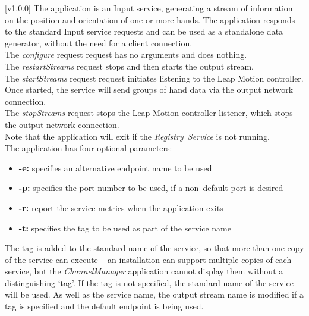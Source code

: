 [v1.0.0]
The  application is an Input service,
generating a stream of information on the position and orientation of one or more hands.
The application responds to the standard Input service requests and can be used as a
standalone data generator, without the need for a client connection.\\

The \emph{configure} request request has no arguments and does nothing.\\

The \emph{restartStreams} request stops and then starts the output stream.\\

The \emph{startStreams} request request initiates listening to the Leap Motion controller.
Once started, the service will send groups of hand data via the output \yarp{} network
connection.\\

The \emph{stopStreams} request stops the Leap Motion controller listener, which stops the
output \yarp{} network connection.\\ 

Note that the application will exit if the \emph{Registry~Service} is not running.\\

The application has four optional parameters:
\begin{itemize}
\item \textbf{-e:} specifies an alternative endpoint name to be used
\item \textbf{-p:} specifies the port number to be used, if a non--default port is desired
\item \textbf{-r:} report the service metrics when the application exits
\item \textbf{-t:} specifies the tag to be used as part of the service name
\end{itemize}
The tag is added to the standard name of the service, so that more than one copy of the
service can execute -- an \mplusm{} installation can support multiple copies of each
 service, but the \emph{ChannelManager} application cannot display them
without a distinguishing `tag'.
If the tag is not specified, the standard name of the service will be used.
As well as the service name, the output stream name is modified if a tag is specified and
the default endpoint is being used.\\

